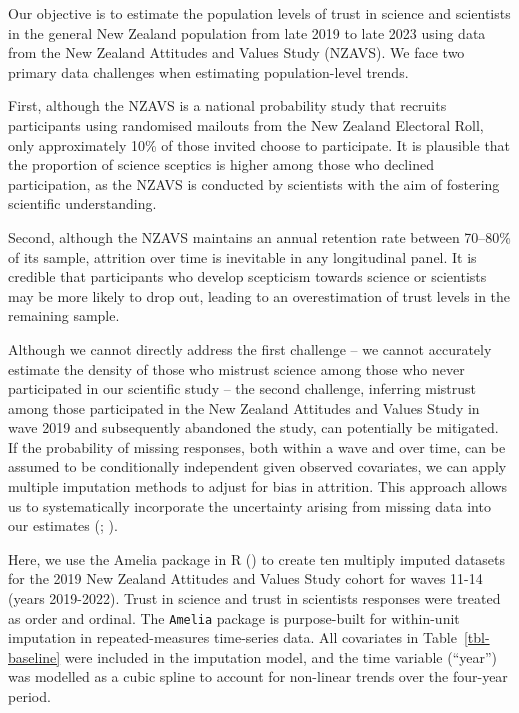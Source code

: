 \documentclass[
  single column]{article}
\begin{document}
Our objective is to estimate the population levels of trust in science
and scientists in the general New Zealand population from late 2019 to
late 2023 using data from the New Zealand Attitudes and Values Study
(NZAVS). We face two primary data challenges when estimating
population-level trends.

First, although the NZAVS is a national probability study that recruits
participants using randomised mailouts from the New Zealand Electoral
Roll, only approximately 10\% of those invited choose to participate. It
is plausible that the proportion of science sceptics is higher among
those who declined participation, as the NZAVS is conducted by
scientists with the aim of fostering scientific understanding.

Second, although the NZAVS maintains an annual retention rate between
70--80\% of its sample, attrition over time is inevitable in any
longitudinal panel. It is credible that participants who develop
scepticism towards science or scientists may be more likely to drop out,
leading to an overestimation of trust levels in the remaining sample.

Although we cannot directly address the first challenge -- we cannot
accurately estimate the density of those who mistrust science among
those who never participated in our scientific study -- the second
challenge, inferring mistrust among those participated in the New
Zealand Attitudes and Values Study in wave 2019 and subsequently
abandoned the study, can potentially be mitigated. If the probability of
missing responses, both within a wave and over time, can be assumed to
be conditionally independent given observed covariates, we can apply
multiple imputation methods to adjust for bias in attrition. This
approach allows us to systematically incorporate the uncertainty arising
from missing data into our estimates
(;
).

Here, we use the Amelia package in R () to create ten multiply imputed datasets for the
2019 New Zealand Attitudes and Values Study cohort for waves 11-14
(years 2019-2022). Trust in science and trust in scientists responses
were treated as order and ordinal. The \texttt{Amelia} package is
purpose-built for within-unit imputation in repeated-measures
time-series data. All covariates in Table~\ref{tbl-baseline} were
included in the imputation model, and the time variable (``year'') was
modelled as a cubic spline to account for non-linear trends over the
four-year period.
\end{document}
